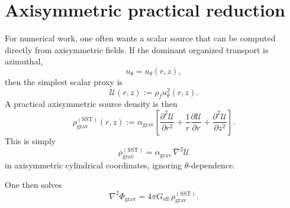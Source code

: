 \documentclass[11pt]{article}
\newcommand{\rhoF}{\rho_{\!f}}
\newcommand{\eff}{\mathrm{eff}}
\newcommand{\SST}{\mathrm{SST}}
\newcommand{\grav}{\mathrm{grav}}
\begin{document}
        \section{Axisymmetric practical reduction}
        
        For numerical work, one often wants a scalar source that can be computed directly from axisymmetric fields. If the dominant organized transport is azimuthal,
        \[
            u_\theta = u_\theta(r,z),
        \]
        then the simplest scalar proxy is
        \begin{equation}
            \mathcal{U}(r,z):=\rhoF u_\theta^2(r,z).
            \label{eq:Urz}
        \end{equation}
        A practical axisymmetric source density is then
        \begin{equation}
            \boxed{
                \rho_{\grav}^{(\SST)}(r,z)
                :=
                \alpha_{\grav}
                \left[
                    \frac{\partial^2 \mathcal{U}}{\partial r^2}
                    +
                    \frac{1}{r}\frac{\partial \mathcal{U}}{\partial r}
                    +
                    \frac{\partial^2 \mathcal{U}}{\partial z^2}
                \right].
            }
            \label{eq:rho-g-axis}
        \end{equation}
        This is simply
        \begin{equation}
            \rho_{\grav}^{(\SST)} = \alpha_{\grav}\,\nabla^2 \mathcal{U}
            \label{eq:rho-g-axis-compact}
        \end{equation}
        in axisymmetric cylindrical coordinates, ignoring \(\theta\)-dependence.
        
        One then solves
        \begin{equation}
            \boxed{
                \nabla^2 \Phi_{\grav}
                =
                4\pi G_{\eff}\,\rho_{\grav}^{(\SST)}.
            }
            \label{eq:poisson-practical}
        \end{equation}
\end{document}
